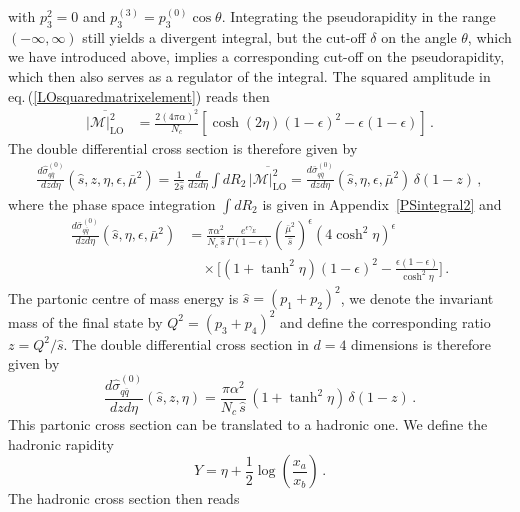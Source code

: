 \documentclass[11pt]{article}
\newcommand{\M}{\mathcal{M}}
\newcommand\eqn[1]     {eq.\,(\ref{#1})}
\begin{document}
with $p_3^2=0$ and $p_3^{(3)}=p_3^{(0)}\cos\theta$. 
Integrating the pseudorapidity in the range 
$(-\infty,\infty)$ still yields a divergent integral, 
but the cut-off $\delta$ on the angle $\theta$, which
we have introduced above, implies a corresponding cut-off 
on the pseudorapidity, which then also serves as a regulator of the 
integral. 
The squared amplitude in \eqn{LOsquaredmatrixelement} reads then
\begin{align}
\overline{\left|\M\right|_\text{LO}^2}
&= \frac{2(4\pi\alpha)^2}{N_c}
\left[\cosh(2\eta)(1-\epsilon)^2-\epsilon(1-\epsilon)\right]
\label{diphotonLO} \,.
\end{align}
The double differential cross section is therefore given by
%
\begin{align}\label{eq:LOsrosssection1}
\frac{d\hat{\sigma}^{(0)}_{q\bar{q}}}{dzd\eta}
(\hat{s},z,\eta,\epsilon,\bar\mu^2) = \frac{1}{2\hat{s}} 
\,\frac{d}{dzd\eta}\int dR_2 \, 
\overline{\left|\M\right|_\text{LO}^2}=\frac{d\bar{\sigma}^{(0)}_{q\bar{q}}}{dzd\eta}
(\hat{s},\eta,\epsilon,\bar\mu^2)\, \delta(1-z)\,,
\end{align}
%
where the phase space integration $\int dR_2$ 
is given in Appendix~\ref{PSintegral2} and
%
\begin{align}\label{eq:LOsrosssection2}
\frac{d\bar{\sigma}^{(0)}_{q\bar{q}}}{dzd\eta}
(\hat{s},\eta,\epsilon,\bar\mu^2) &= 
\frac{\pi \alpha^2}{N_c\,\hat{s}}
\frac{e^{\epsilon\gamma_E}}{\Gamma(1-\epsilon)}
\left(\frac{\bar\mu^2}{\hat{s}}\right)^{\epsilon}
(4\cosh^2\eta)^{\epsilon} \nonumber \\
&\quad\times \bigg[(1+\tanh^2\eta)(1-\epsilon)^2-\frac{\epsilon(1-\epsilon)}{\cosh^2\eta}\bigg]\,.
\end{align}
%
The partonic 
centre of mass energy is $\hat s = (p_1 + p_2)^2$,
we denote the invariant mass of the final state by
$Q^2 = (p_3 + p_4)^2$ and define the
corresponding ratio $z = Q^2/\hat s$. 
The double differential cross section 
in $d=4$ dimensions is therefore given by 
\begin{equation}\label{eq:dsigmagammalo}
\frac{d\hat{\sigma}_{q\bar{q}}^{(0)}}{dzd\eta}(\hat{s},z,\eta) 
= \frac{\pi \alpha^2}{N_c\,\hat{s}}\,(1+\tanh^2\eta)
\,\delta(1-z)\,. 
\end{equation}
This partonic cross section can be translated to a hadronic one. We define the hadronic rapidity
\begin{equation}
    Y=\eta+\frac12\log\left(\frac{x_a}{x_b}\right)\,.
\end{equation}
The hadronic cross section then reads
\end{document}

